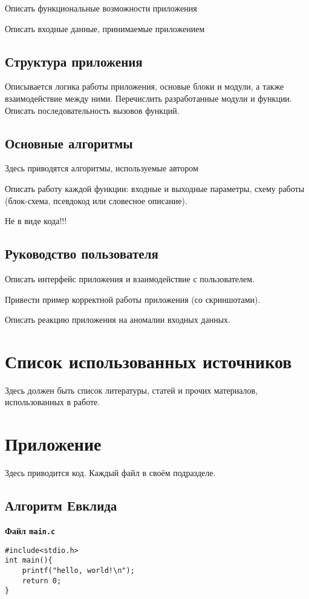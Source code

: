 \documentclass[a4paper,14pt]{extarticle}
\begin{document}
Описать функциональные возможности приложения 

Описать входные данные, принимаемые приложением

\subsection{Структура приложения}
Описывается логика работы приложения, основые блоки и модули, а также взаимодействие между ними.
Перечислить разработанные модули и функции.  
Описать последовательность вызовов функций. 

\subsection{Основные алгоритмы}
Здесь приводятся алгоритмы, используемые автором

Описать работу каждой функции: входные и выходные параметры, схему работы (блок-схема, псевдокод или словесное описание).

Не в виде кода!!!

\subsection{Руководство пользователя}
Описать интерфейс приложения и взаимодействие с пользователем.

Привести пример корректной работы приложения (со скриншотами).

Описать реакцию приложения на аномалии входных данных.

\section{Список использованных источников}
Здесь должен быть список литературы, статей и прочих материалов, использованных в работе. 
\newpage

\section{Приложение}
Здесь приводится код. Каждый файл в своём подразделе.

\subsection{Алгоритм Евклида}\label{code:evclid}
\centerline{\textbf{Файл \texttt{main.c}}}
\begin{verbatim}
#include<stdio.h>
int main(){	
	printf("hello, world!\n");
	return 0;
}
\end{verbatim}
\hrulefill
\end{document}

